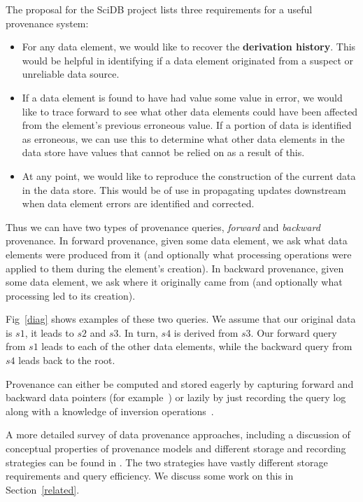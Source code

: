The proposal for the SciDB project\cite{stonebraker9requirements} lists three requirements for a useful provenance system:

\begin{itemize}
\item For any data element, we would like to recover the \textbf{derivation history}. This would be helpful in identifying if a data element originated from a suspect or unreliable data source.
\item If a data element is found to have had value some value in error, we would like to trace forward to see what other data elements could have been affected from the element's previous erroneous value. If a portion of data is identified as erroneous, we can use this to determine what other data elements in the data store have values that cannot be relied on as a result of this.
\item At any point, we would like to reproduce the construction of the current data in the data store. This would be of use in propagating updates downstream when data element errors are identified and corrected.
\end{itemize}

Thus we can have two types of provenance queries, \textit{forward} and \textit{backward} provenance. In forward provenance, given some data element, we ask what data elements were produced from it (and optionally what processing operations were applied to them during the element's creation). In backward provenance, given some data element, we ask where it originally came from (and optionally what processing led to its creation). 

Fig~\ref{diag} shows examples of these two queries. We assume that our original data is $s1$, it leads to $s2$ and $s3$. In turn, $s4$ is derived from $ s3$. Our forward query from $ s1$ leads to each of the other data elements, while the backward query from  $s4$ leads back to the root. 

Provenance can either be computed and stored eagerly by capturing forward and backward data pointers (for example~\cite{widom2005trio}) or lazily by just recording the query log along with a knowledge of inversion operations~\cite{stonebraker9requirements}. 

A more detailed survey of data provenance approaches, including a discussion of conceptual properties of provenance models and different storage and recording strategies can be found in \cite{glavic_dataprovenance}. The two strategies have vastly different storage requirements and query efficiency. We discuss some work on this in Section~\ref{related}.